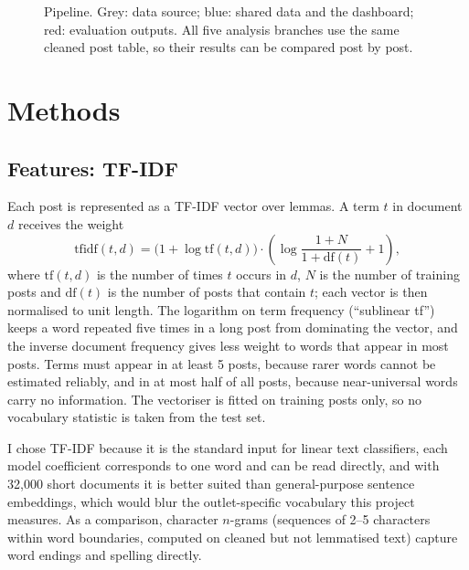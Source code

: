 \documentclass[11pt,a4paper]{article}
\begin{document}
\begin{figure}[H]
\caption{Pipeline. Grey: data source; blue: shared data and the dashboard; red: evaluation outputs. All five analysis branches use the same cleaned post table, so their results can be compared post by post.}
\label{fig:pipeline}
\end{figure}

\section{Methods}
\label{sec:methods}

\subsection{Features: TF-IDF}
Each post is represented as a TF-IDF vector over lemmas. A term $t$ in document $d$ receives the weight
\begin{equation}
\mathrm{tfidf}(t,d) = \big(1+\log \mathrm{tf}(t,d)\big)\cdot\left(\log\frac{1+N}{1+\mathrm{df}(t)}+1\right),
\end{equation}
where $\mathrm{tf}(t,d)$ is the number of times $t$ occurs in $d$, $N$ is the number of training posts and $\mathrm{df}(t)$ is the number of posts that contain $t$; each vector is then normalised to unit length. The logarithm on term frequency (``sublinear tf'') keeps a word repeated five times in a long post from dominating the vector, and the inverse document frequency gives less weight to words that appear in most posts. Terms must appear in at least 5 posts, because rarer words cannot be estimated reliably, and in at most half of all posts, because near-universal words carry no information. The vectoriser is fitted on training posts only, so no vocabulary statistic is taken from the test set.

I chose TF-IDF because it is the standard input for linear text classifiers, each model coefficient corresponds to one word and can be read directly, and with 32,000 short documents it is better suited than general-purpose sentence embeddings, which would blur the outlet-specific vocabulary this project measures. As a comparison, character $n$-grams (sequences of 2--5 characters within word boundaries, computed on cleaned but not lemmatised text) capture word endings and spelling directly.
\end{document}
